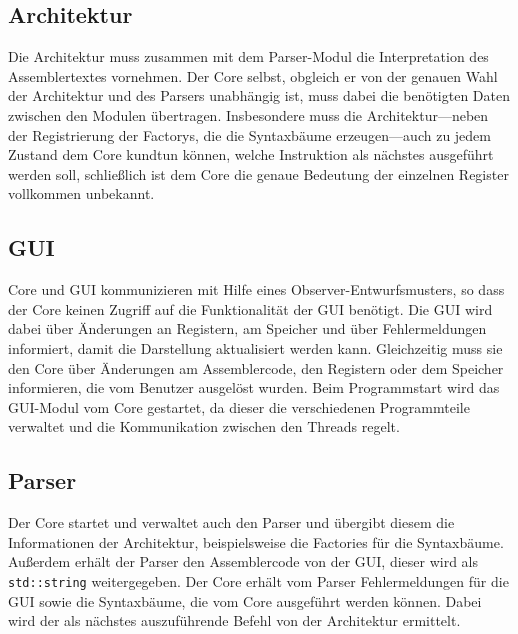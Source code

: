 \subsection{Architektur}
Die Architektur muss zusammen mit dem Parser-Modul die Interpretation des Assemblertextes vornehmen. Der Core selbst, obgleich er von der genauen Wahl der Architektur und des Parsers unabhängig ist, muss dabei die benötigten Daten zwischen den Modulen übertragen. Insbesondere muss die Architektur---neben der Registrierung der Factorys, die die Syntaxbäume erzeugen---auch zu jedem Zustand dem Core kundtun können, welche Instruktion als nächstes ausgeführt werden soll, schließlich ist dem Core die genaue Bedeutung der einzelnen Register vollkommen unbekannt.

\subsection{GUI}

Core und GUI kommunizieren mit Hilfe eines Observer-Entwurfsmusters, so dass der Core keinen Zugriff auf die Funktionalität der GUI benötigt. Die GUI wird dabei über Änderungen an Registern, am Speicher und über Fehlermeldungen informiert, damit die Darstellung aktualisiert werden kann. Gleichzeitig muss sie den Core über Änderungen am Assemblercode, den Registern oder dem Speicher informieren, die vom Benutzer ausgelöst wurden. Beim Programmstart wird das GUI-Modul vom Core gestartet, da dieser die verschiedenen Programmteile verwaltet und die Kommunikation zwischen den Threads regelt.

\subsection{Parser}

Der Core startet und verwaltet auch den Parser und übergibt diesem die Informationen der Architektur, beispielsweise die Factories für die Syntaxbäume. Au{\ss}erdem erhält der Parser den Assemblercode von der GUI, dieser wird als \lstinline[style=C++]!std::string! weitergegeben. Der Core erhält vom Parser Fehlermeldungen für die GUI sowie die Syntaxbäume, die vom Core ausgeführt werden können. Dabei wird der als nächstes auszuführende Befehl von der Architektur ermittelt.
